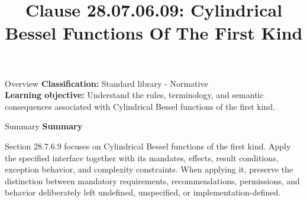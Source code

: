 \documentclass[10pt,letterpaper]{article}
\title{Clause 28.07.06.09: Cylindrical Bessel Functions Of The First Kind}
\author{}
\date{}
\begin{document}
\maketitle
\begin{CornellOverviewBox}{Overview}
\textbf{Classification:} Standard library - Normative\\[2pt]
\textbf{Learning objective:} Understand the rules, terminology, and semantic consequences associated with Cylindrical Bessel functions of the first kind.
\end{CornellOverviewBox}\begin{CornellSummaryBox}{Summary}
{\sffamily\bfseries\color{Accent} Summary}\par\vspace{3pt}Section 28.7.6.9 focuses on Cylindrical Bessel functions of the first kind. Apply the specified interface together with its mandates, effects, result conditions, exception behavior, and complexity constraints. When applying it, preserve the distinction between mandatory requirements, recommendations, permissions, and behavior deliberately left undefined, unspecified, or implementation-defined.
\end{CornellSummaryBox}
\end{document}
